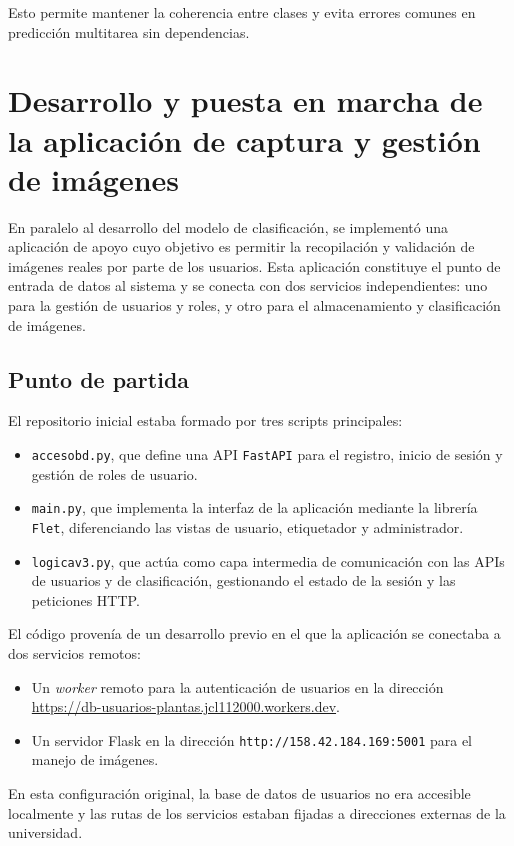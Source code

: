 \documentclass[12pt,a4paper]{article}
\begin{document}
Esto permite mantener la coherencia entre clases y evita errores comunes en predicción multitarea sin dependencias.


\section{Desarrollo y puesta en marcha de la aplicación de captura y gestión de imágenes}

En paralelo al desarrollo del modelo de clasificación, se implementó una aplicación de apoyo cuyo objetivo es permitir la recopilación y validación de imágenes reales por parte de los usuarios. Esta aplicación constituye el punto de entrada de datos al sistema y se conecta con dos servicios independientes: uno para la gestión de usuarios y roles, y otro para el almacenamiento y clasificación de imágenes.

\subsection{Punto de partida}

El repositorio inicial estaba formado por tres scripts principales:
\begin{itemize}
    \item \texttt{accesobd.py}, que define una API \texttt{FastAPI} para el registro, inicio de sesión y gestión de roles de usuario.
    \item \texttt{main.py}, que implementa la interfaz de la aplicación mediante la librería \texttt{Flet}, diferenciando las vistas de usuario, etiquetador y administrador.
    \item \texttt{logicav3.py}, que actúa como capa intermedia de comunicación con las APIs de usuarios y de clasificación, gestionando el estado de la sesión y las peticiones HTTP.
\end{itemize}

El código provenía de un desarrollo previo en el que la aplicación se conectaba a dos servicios remotos:
\begin{itemize}
    \item Un \textit{worker} remoto para la autenticación de usuarios en la dirección \url{https://db-usuarios-plantas.jcl112000.workers.dev}.
    \item Un servidor Flask en la dirección \texttt{http://158.42.184.169:5001} para el manejo de imágenes.
\end{itemize}

En esta configuración original, la base de datos de usuarios no era accesible localmente y las rutas de los servicios estaban fijadas a direcciones externas de la universidad.
\end{document}
